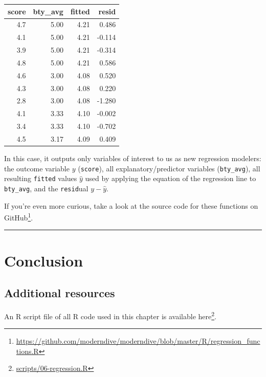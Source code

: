 \documentclass[12pt, krantz2,]{krantz}
\renewcommand{\href}[2]{#2\footnote{\url{#1}}}
\begin{document}
\begin{table}[H]
\centering\begingroup\fontsize{10}{12}\selectfont

\begin{tabular}{r|r|r|r}
\hline
score & bty\_avg & fitted & resid\\
\hline
4.7 & 5.00 & 4.21 & 0.486\\
\hline
4.1 & 5.00 & 4.21 & -0.114\\
\hline
3.9 & 5.00 & 4.21 & -0.314\\
\hline
4.8 & 5.00 & 4.21 & 0.586\\
\hline
4.6 & 3.00 & 4.08 & 0.520\\
\hline
4.3 & 3.00 & 4.08 & 0.220\\
\hline
2.8 & 3.00 & 4.08 & -1.280\\
\hline
4.1 & 3.33 & 4.10 & -0.002\\
\hline
3.4 & 3.33 & 4.10 & -0.702\\
\hline
4.5 & 3.17 & 4.09 & 0.409\\
\hline
\end{tabular}
\endgroup{}
\end{table}

In this case, it outputs only variables of interest to us as new regression modelers: the outcome variable \(y\) (\texttt{score}), all explanatory/predictor variables (\texttt{bty\_avg}), all resulting \texttt{fitted} values \(\hat{y}\) used by applying the equation of the regression line to \texttt{bty\_avg}, and the \texttt{resid}ual \(y - \hat{y}\).

If you're even more curious, take a look at the source code for these functions on \href{https://github.com/moderndive/moderndive/blob/master/R/regression_functions.R}{GitHub}.

\begin{center}\rule{0.5\linewidth}{\linethickness}\end{center}

\hypertarget{conclusion-4}{%
\section{Conclusion}\label{conclusion-4}}

\hypertarget{additional-resources-4}{%
\subsection{Additional resources}\label{additional-resources-4}}

An R script file of all R code used in this chapter is available \href{scripts/06-regression.R}{here}.
\end{document}
